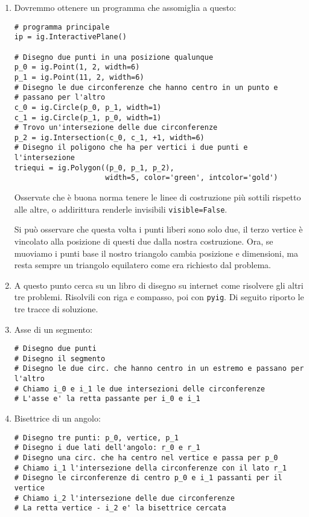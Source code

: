 \begin{enumerate} [noitemsep]
\item Dovremmo ottenere un programma che assomiglia a questo:

\begin{lstlisting}
# programma principale
ip = ig.InteractivePlane()

# Disegno due punti in una posizione qualunque
p_0 = ig.Point(1, 2, width=6)
p_1 = ig.Point(11, 2, width=6)
# Disegno le due circonferenze che hanno centro in un punto e 
# passano per l'altro
c_0 = ig.Circle(p_0, p_1, width=1)
c_1 = ig.Circle(p_1, p_0, width=1)
# Trovo un'intersezione delle due circonferenze
p_2 = ig.Intersection(c_0, c_1, +1, width=6)
# Disegno il poligono che ha per vertici i due punti e l'intersezione
triequi = ig.Polygon((p_0, p_1, p_2),
                     width=5, color='green', intcolor='gold')
\end{lstlisting}

Osservate che è buona norma tenere le linee di costruzione più sottili
rispetto alle altre, o addirittura renderle invisibili \texttt{visible=False}.

Si può osservare che questa volta i punti liberi sono solo due, il terzo
vertice è vincolato alla posizione di questi due dalla nostra costruzione.
Ora, se muoviamo i punti base il nostro triangolo cambia posizione e
dimensioni, ma resta sempre un triangolo equilatero come era richiesto dal
problema.

\item A questo punto cerca su un libro di disegno su internet come risolvere
gli altri tre problemi. Risolvili con riga e compasso, poi con \texttt{pyig}.
Di seguito riporto le tre tracce di soluzione.

\item Asse di un segmento:

\begin{lstlisting}
# Disegno due punti
# Disegno il segmento
# Disegno le due circ. che hanno centro in un estremo e passano per l'altro
# Chiamo i_0 e i_1 le due intersezioni delle circonferenze
# L'asse e' la retta passante per i_0 e i_1
\end{lstlisting}

\item Bisettrice di un angolo:

\begin{lstlisting}
# Disegno tre punti: p_0, vertice, p_1
# Disegno i due lati dell'angolo: r_0 e r_1
# Disegno una circ. che ha centro nel vertice e passa per p_0
# Chiamo i_1 l'intersezione della circonferenze con il lato r_1
# Disegno le circonferenze di centro p_0 e i_1 passanti per il vertice
# Chiamo i_2 l'intersezione delle due circonferenze
# La retta vertice - i_2 e' la bisettrice cercata
\end{lstlisting}


\end{enumerate}
